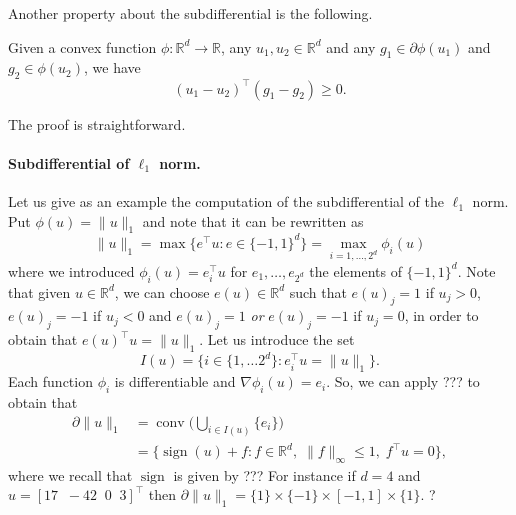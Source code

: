 \documentclass[
	fontsize=11pt, %
	twoside=false, %
	numbers=noenddot, %
]{kaobook}
\newcommand{\R}{\mathbb R}
\newcommand{\grad}{\nabla}
\newcommand{\norm}[1]{\| #1 \|}
\DeclareMathOperator{\conv}{conv}
\DeclareMathOperator{\sign}{sign}
\begin{document}
Another property about the subdifferential is the following.
\begin{proposition}
	Given a convex function $\phi : \R^d \rightarrow \R$, any $u_1, u_2 \in \R^d$ and any $g_1 \in \partial \phi(u_1)$ and $g_2 \in \phi(u_2)$, we have
	\begin{equation*}
		(u_1 - u_2)^\top (g_1 - g_2) \geq 0.
	\end{equation*}
\end{proposition}
The proof is straightforward.%

\paragraph{Subdifferential of $\ell_1$ norm.} 

Let us give as an example the computation of the subdifferential of the $\ell_1$ norm.
Put $\phi(u) = \norm{u}_1$ and note that it can be rewritten as
\begin{equation*}
	\norm{u}_1 = \max \big\{ e^\top u : e \in \{ -1, 1 \}^d \big\} = \max_{i=1, \ldots, 2^d} \phi_i(u)
\end{equation*}
where we introduced $\phi_i(u) = e_i^\top u$ for $e_1, \ldots, e_{2^d}$ the elements of $\{ -1, 1 \}^d$.
Note that given $u \in \R^d$, we can choose $e(u) \in \R^d$ such that $e(u)_j = 1$ if $u_j > 0$, $e(u)_j = -1$ if $u_j < 0$ and $e(u)_j = 1$ \emph{or} $e(u)_j = -1$ if $u_j = 0$, in order to obtain that $e(u)^\top u = \norm{u}_1$.
Let us introduce the set
\begin{equation*}
	I(u) = \big\{ i \in \{ 1, \ldots 2^d \} : e_i^\top u = \norm{u}_1 \big\}.
\end{equation*}
Each function $\phi_i$ is differentiable and $\grad \phi_i(u) = e_i$. 
So, we can apply ??? to obtain that
\begin{align*}
	\partial \norm{u}_1 &= \conv\Big( \bigcup_{i \in I(u)} \{ e_i \} \Big) \\
	&= \big\{ \sign(u) + f : f \in \R^d, \; \norm{f}_\infty \leq 1, \; f^\top u = 0 
	\big\},
\end{align*}
where we recall that $\sign$ is given by ???
For instance if $d = 4$ and $u = [17 \;\; -42 \;\; 0 \;\; 3]^\top$ then $\partial \norm{u}_1 = \{ 1 \} \times \{ -1 \} \times [-1, 1] \times \{ 1 \}$.
 ?
\end{document}
